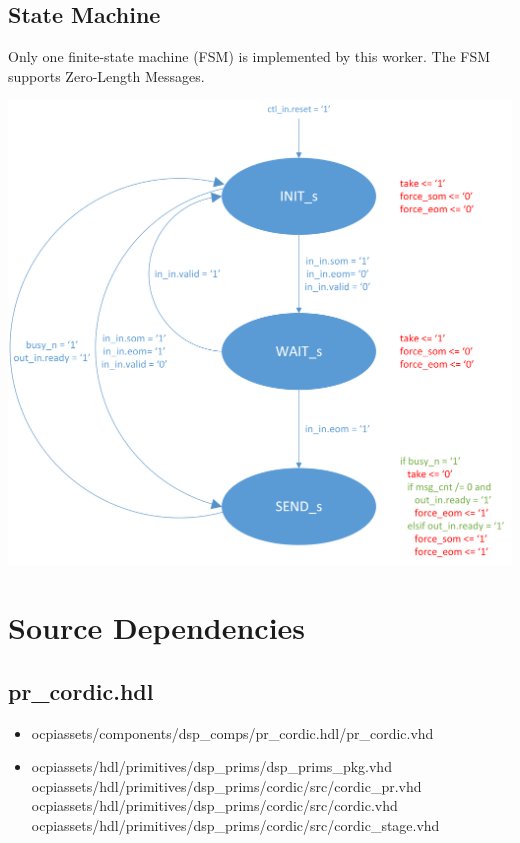 \documentclass{article}
\def\comp{pr\_cordic}
\begin{document}
	\subsection*{State Machine}
	\begin{flushleft}
		Only one finite-state machine (FSM) is implemented by this worker. The FSM supports Zero-Length Messages.
	\end{flushleft}
	{\centering\captionsetup{type=figure}\includegraphics[scale=0.6]{zlm_fsm}\par{}\label{fig:zlm_fsm}}

\section*{Source Dependencies}
\subsection*{\comp.hdl}
\begin{itemize}
	\item ocpiassets/components/dsp\_comps/pr\_cordic.hdl/pr\_cordic.vhd
	\item ocpiassets/hdl/primitives/dsp\_prims/dsp\_prims\_pkg.vhd
	      \subitem ocpiassets/hdl/primitives/dsp\_prims/cordic/src/cordic\_pr.vhd
	      \subitem ocpiassets/hdl/primitives/dsp\_prims/cordic/src/cordic.vhd
	      \subitem ocpiassets/hdl/primitives/dsp\_prims/cordic/src/cordic\_stage.vhd
\end{itemize}
\end{document}

